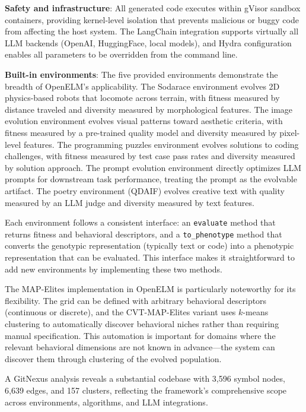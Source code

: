 \textbf{Safety and infrastructure}: All generated code executes within gVisor sandbox containers, providing kernel-level isolation that prevents malicious or buggy code from affecting the host system. The LangChain integration supports virtually all LLM backends (OpenAI, HuggingFace, local models), and Hydra configuration enables all parameters to be overridden from the command line.

\textbf{Built-in environments}: The five provided environments demonstrate the breadth of OpenELM's applicability. The Sodarace environment evolves 2D physics-based robots that locomote across terrain, with fitness measured by distance traveled and diversity measured by morphological features. The image evolution environment evolves visual patterns toward aesthetic criteria, with fitness measured by a pre-trained quality model and diversity measured by pixel-level features. The programming puzzles environment evolves solutions to coding challenges, with fitness measured by test case pass rates and diversity measured by solution approach. The prompt evolution environment directly optimizes LLM prompts for downstream task performance, treating the prompt as the evolvable artifact. The poetry environment (QDAIF) evolves creative text with quality measured by an LLM judge and diversity measured by text features.

Each environment follows a consistent interface: an \texttt{evaluate} method that returns fitness and behavioral descriptors, and a \texttt{to\_phenotype} method that converts the genotypic representation (typically text or code) into a phenotypic representation that can be evaluated. This interface makes it straightforward to add new environments by implementing these two methods.

The MAP-Elites implementation in OpenELM is particularly noteworthy for its flexibility. The grid can be defined with arbitrary behavioral descriptors (continuous or discrete), and the CVT-MAP-Elites variant uses $k$-means clustering to automatically discover behavioral niches rather than requiring manual specification. This automation is important for domains where the relevant behavioral dimensions are not known in advance---the system can discover them through clustering of the evolved population.

A GitNexus analysis reveals a substantial codebase with 3,596 symbol nodes, 6,639 edges, and 157 clusters, reflecting the framework's comprehensive scope across environments, algorithms, and LLM integrations.

